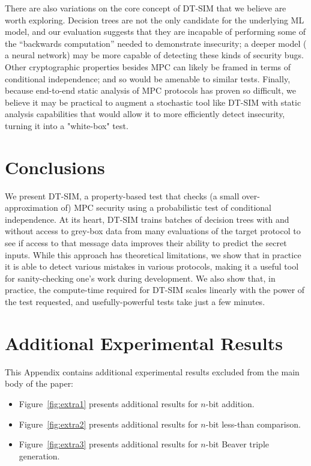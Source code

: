 \documentclass[compsoc, conference, a4paper, 10pt, times]{IEEEtran}
\newcommand{\toolname}{\textsc{DT-SIM}\xspace}
\begin{document}
There are also variations on the core concept of \toolname that we believe are worth exploring.
Decision trees are not the only candidate for the underlying ML model, and our evaluation suggests that they are incapable of performing some of the ``backwards computation'' needed to demonstrate insecurity;
a deeper model (\eg{} a neural network) may be more capable of detecting these kinds of security bugs.
Other cryptographic properties besides MPC can likely be framed in terms of conditional independence;
and so would be amenable to similar tests.
Finally, because end-to-end static analysis of MPC protocols has proven so difficult,
we believe it may be practical to augment a stochastic tool like \toolname with static analysis capabilities
that would allow it to more efficiently detect insecurity, turning it into a "white-box" test.


\section{Conclusions}

We present \toolname,
a property-based test that checks (a small over-approximation of) MPC security
using a probabilistic test of conditional independence.
At its heart, \toolname trains batches of decision trees with and without access to grey-box data from many evaluations of the target protocol
to see if access to that message data improves their ability to predict the secret inputs.
While this approach has theoretical limitations, we show that in practice it is able to detect various mistakes in various protocols,
making it a useful tool for sanity-checking one's work during development.
We also show that, in practice, the compute-time required for \toolname scales linearly with the power of the test requested,
and usefully-powerful tests take just a few minutes.







\appendices

\section{Additional Experimental Results}
\label{sec:addit-exper-results}

This Appendix contains additional experimental results excluded from the main body of the paper:
%
\begin{itemize}
\item Figure~\ref{fig:extra1} presents additional results for $n$-bit addition.
\item Figure~\ref{fig:extra2} presents additional results for $n$-bit less-than comparison.
\item Figure~\ref{fig:extra3} presents additional results for $n$-bit Beaver triple generation.
\end{itemize}
\end{document}
